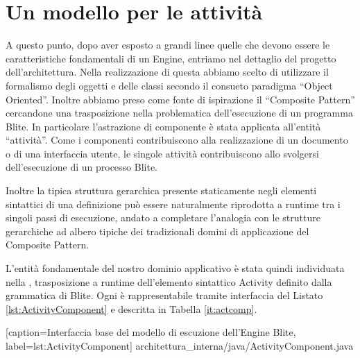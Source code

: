 \section{Un modello per le attività}
A questo punto, dopo aver esposto a grandi linee quelle che devono essere le
caratteristiche fondamentali di un Engine, entriamo nel dettaglio del progetto
dell'architettura. Nella realizzazione di questa abbiamo scelto di utilizzare
il formalismo degli oggetti e delle classi secondo il consueto paradigma
``Object Oriented''. Inoltre abbiamo preso come fonte di
ispirazione il ``Composite Pattern'' \cite{GANGo4} cercandone una trasposizione
nella problematica dell'esecuzione di un programma Blite. In particolare
l'astrazione di componente \`e stata applicata all'entità ``attività''. Come i
componenti contribuiscono alla realizzazione di un documento o di una
interfaccia utente, le singole attività contribuiscono allo svolgersi
dell'esecuzione di un processo Blite.
 
Inoltre la tipica struttura gerarchica presente staticamente negli elementi
sintattici di una definizione può essere naturalmente riprodotta a runtime tra
i singoli passi di esecuzione, andato a completare l'analogia con le strutture
gerarchiche ad albero tipiche dei tradizionali domini di applicazione del
Composite Pattern. 

L'entità fondamentale del nostro dominio applicativo \`e stata quindi
individuata nella , trasposizione a runtime
dell'elemento sintattico Activity definito dalla grammatica di Blite.
Ogni  \`e rappresentabile tramite 
interfaccia del Listato \ref{lst:ActivityComponent} e descritta in Tabella \ref{it:actcomp}.


[caption={Interfaccia base del modello di escuzione dell'Engine Blite},
label=lst:ActivityComponent]
{architettura_interna/java/ActivityComponent.java}

